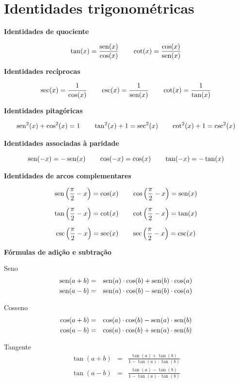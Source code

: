  \newpage

 \section{Identidades trigonométricas}

 \textbf{Identidades de quociente}

 \[\tan(x)= \dfrac{\operatorname{sen}(x)}{\cos(x)} \qquad \operatorname{cot}(x)= \dfrac{\cos(x)}{\operatorname{sen}(x)}\]

 \vskip0.5cm
 \textbf{Identidades recíprocas}

 \[\sec(x)= \dfrac{1}{\cos(x)} \qquad
   \csc(x)= \dfrac{1}{\operatorname{sen}(x)} \qquad
   \operatorname{cot}(x)= \dfrac{1}{\tan(x)}\]

 \vskip0.5cm
 \textbf{Identidades pitagóricas}

 \[\operatorname{sen}^2(x) + \cos^2(x)= 1 \qquad
   \tan^2(x)+ 1= \sec^2(x) \qquad
   \operatorname{cot}^2(x)+1=\operatorname{csc}^2(x)\]

 \vskip0.5cm
 \textbf{Identidades associadas à paridade}

 \[\operatorname{sen}(-x)= -\operatorname{sen}(x) \qquad \cos(-x)= \cos(x) \qquad \tan(-x)=-\tan(x)\]

 \vskip0.5cm
 \textbf{Identidades de arcos complementares}

 \[\operatorname{sen} \left(\frac{\pi}{2} - x \right)= \cos(x) \qquad
   \cos \left(\frac{\pi}{2} - x \right)= \operatorname{sen}(x)\]

 \[\tan \left(\frac{\pi}{2} - x \right)= \operatorname{cot}(x) \qquad
   \operatorname{cot} \left(\frac{\pi}{2} - x \right)= \tan(x)\]

 \[\operatorname{csc} \left(\frac{\pi}{2} - x \right)= \sec(x) \qquad
   \sec \left(\frac{\pi}{2} - x \right)= \operatorname{csc}(x)\]


\vskip0.5cm
 \textbf{Fórmulas de adição e subtração}

 Seno
 \begin{eqnarray*}
  \operatorname{sen}(a+b)&=&\operatorname{sen}(a)\cdot \cos(b)+\operatorname{sen}(b)\cdot \cos(a) \\
  \operatorname{sen}(a-b)&=&\operatorname{sen}(a)\cdot \cos(b)-\operatorname{sen}(b)\cdot \cos(a)
 \end{eqnarray*}

 Cosseno
 \begin{eqnarray*}
  \cos(a+b)&=&\cos(a)\cdot \cos(b)-\operatorname{sen}(a)\cdot \operatorname{sen}(b) \\
  \cos(a-b)&=&\cos(a)\cdot \cos(b)+\operatorname{sen}(a)\cdot \operatorname{sen}(b)
 \end{eqnarray*}

 Tangente
 \begin{eqnarray*}
  \tan(a+b)&=& \frac{\tan(a)+\tan(b)}{1-\tan(a)\cdot \tan(b)} \\
  \tan(a-b)&=& \frac{\tan(a)-\tan(b)}{1-\tan(a)\cdot \tan(b)}
 \end{eqnarray*}
 
